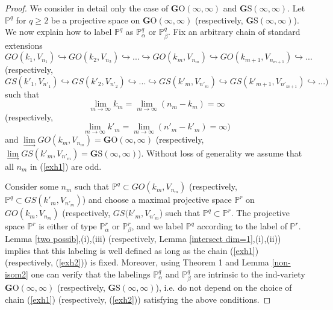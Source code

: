 \documentclass[12pt]{amsart}
\theoremstyle{definition}
\begin{document}
\begin{proof} We consider in detail only the case of  $\mathbf{G}\mathrm{O}(\infty,\infty)$ and
$\mathbf{G}\mathrm{S}(\infty,\infty)$.
Let $\mathbb{P}^q$ for $q\ge2$ be a projective space on $\mathbf{G}\mathrm{O}(\infty,\infty)$ (respectively,
$\mathbf{G}\mathrm{S}(\infty,\infty)$). We now explain how to label $\mathbb{P}^q$ as $\mathbb{P}^q_{\alpha}$ or
$\mathbb{P}^q_{\beta}$. Fix an arbitrary chain of standard extensions
\begin{equation}\label{exh1}
GO(k_1,V_{n_1})\hookrightarrow GO(k_2,V_{n_2})\hookrightarrow...\hookrightarrow GO(k_m,V_{n_m})\hookrightarrow
GO(k_{m+1},V_{n_{m+1}})\hookrightarrow...
\end{equation}
(respectively,
\begin{equation}\label{exh2}
GS(k'_1,V_{n'_1})\hookrightarrow GS(k'_2,V_{n'_2})\hookrightarrow...\hookrightarrow GS(k'_m,V_{n'_m})\hookrightarrow
GS(k'_{m+1},V_{n'_{m+1}})\hookrightarrow...)
\end{equation}
such that
$$
\underset{m\to\infty}\lim k_m=\underset{m\to\infty}\lim(n_m-k_m)=\infty
$$
(respectively,
$$
\underset{m\to\infty}\lim k'_m=\underset{m\to\infty}\lim(n'_m-k'_m)=\infty)
$$
and
$\underset{\to}\lim GO(k_m,V_{n_m})=\mathbf{G}\textrm{O}(\infty,\infty)$ (respectively,
$\underset{\to}\lim GS(k'_m,V_{n'_m})=\mathbf{G}\textrm{S}(\infty,\infty)$). Without loss of generality we assume
that all $n_m$ in (\ref{exh1}) are odd.

Consider some $n_m$ such that $\mathbb{P}^q\subset GO(k_m,V_{n_m})$ (respectively, $\mathbb{P}^q\subset
GS(k'_m,V_{n'_m})$) and choose a maximal projective space $\mathbb{P}^r$ on $GO(k_m,V_{n_m})$ (respectively,
$GS(k'_m,V_{n'_m}$) such that $\mathbb{P}^q\subset\mathbb{P}^r$. The projective space $\mathbb{P}^r$ is either of type
$\mathbb{P}^r_{\alpha}$ or $\mathbb{P}^r_{\beta}$,  and we label $\mathbb{P}^q$ according to the label of
$\mathbb{P}^r$.
Lemma \ref{two possib},(i),(iii) (respectively, Lemma \ref{intersect dim=1},(i),(ii)) implies that this labeling is well
defined as long as the chain (\ref{exh1}) (respectively,  (\ref{exh2})) is fixed. Moreover, using Theorem 1 and
Lemma \ref{non-isom2} one can verify that the labelings $\mathbb{P}^q_{\alpha}$ and $\mathbb{P}^q_{\beta}$ are intrinsic
to the ind-variety $\mathbf{G}\mathrm{O}(\infty,\infty)$ (respectively, $\mathbf{G}\mathrm{S}(\infty,\infty)$), i.e. do
not depend on the
choice of chain (\ref{exh1}) (respectively,  (\ref{exh2})) satisfying the above conditions.


\end{proof}
\end{document}
